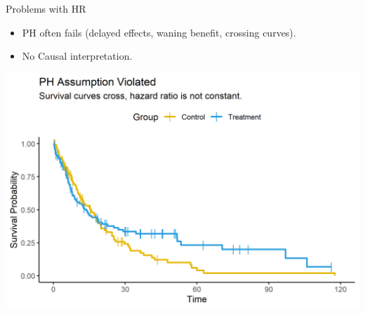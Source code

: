 \documentclass{beamer}
\begin{document}
\begin{frame}
\begin{columns}[T,onlytextwidth]
  \begin{column}{0.48\textwidth}
    \begin{block}{Problems with HR}
      \begin{itemize}
        \item PH often fails (delayed effects, waning benefit, crossing curves).
        \item No Causal interpretation.
      \end{itemize}
    \end{block}
    \centering
    \includegraphics[width=\linewidth,height = 0.9\linewidth]{images/ph_assumption_violated.png} \\
  \end{column}
\end{columns}

\end{frame}
\end{document}

